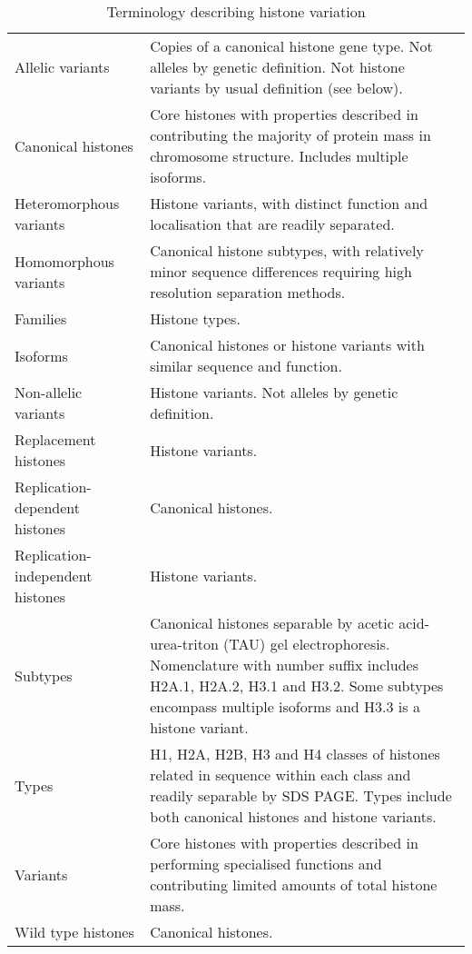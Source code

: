   \begin{table*}
    \caption{Terminology describing histone variation}
    \label{tab:histone-divisions}
    \centering
    \begin{tabular}{F p{\dimexpr(\textwidth--4\tabcolsep)}}
      \toprule
	  Allelic variants &
	  Copies of a canonical histone gene type.
	  Not alleles by genetic definition. 
	  Not histone variants by usual definition (see below). \\
      \addlinespace
	  Canonical histones &
	  Core histones with properties described in  
	  contributing the majority of protein mass in chromosome structure. 
	  Includes multiple isoforms.
	  \\
      \addlinespace
	  Heteromorphous variants &
	  Histone variants, 
	  with distinct function and localisation that are readily separated. \\
      \addlinespace
	  Homomorphous variants &
	  Canonical histone subtypes,
	  with relatively minor sequence differences requiring high resolution separation methods. \\
      \addlinespace
	  Families &
	  Histone types. \\
      \addlinespace
	  Isoforms &
	  Canonical histones or histone variants with similar sequence and function. \\
      \addlinespace
	  Non-allelic variants &
	  Histone variants.
	  Not alleles by genetic definition. \\
      \addlinespace
      Replacement histones &
	  Histone variants. \\
      \addlinespace
	  Replication-dependent histones &
	  Canonical histones. \\
      \addlinespace
	  Replication-independent histones &
	  Histone variants. \\
      \addlinespace
	  Subtypes &
	  Canonical histones separable by acetic acid-urea-triton (TAU) gel electrophoresis. 
	  Nomenclature with number suffix includes H2A.1, H2A.2, H3.1 and H3.2. 
	  Some subtypes encompass multiple isoforms and H3.3 is a histone variant. \\
      \addlinespace
	  Types &
	  H1, H2A, H2B, H3 and H4 classes of histones
	  related in sequence within each class and readily separable by SDS PAGE. 
	  Types include both canonical histones and histone variants. \\
      \addlinespace
	  Variants &
	  Core histones with properties described in  
	  performing specialised functions and contributing limited amounts of total histone mass. \\
      \addlinespace
	  Wild type histones &
	  Canonical histones. \\
      \bottomrule
    \end{tabular}
  \end{table*}

